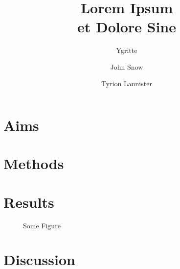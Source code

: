 \documentclass[a4paper]{p-oldpaper}
\title{Lorem Ipsum\\ et Dolore Sine}
\author[1]{Ygritte}
\author[1]{John Snow}
\author[2]{Tyrion Lannister}
\affil[1]{House Stark}
\affil[2]{House Lannister}
\begin{document}
\begin{multicols}{3}

	\section{Aims}
	\blindtext

	\section{Methods}
	\blindtext
	
	\section{Results}
	\blindtext
	
	\begin{figure}[H]
		\begin{center}
		\begin{pgfpicture}
		\end{pgfpicture}
		\end{center}
		\caption{Some Figure}
	\end{figure}
	
	\blindtext
	
	\blindtext
	
	\section{Discussion}
	\blindtext
	
	\blindtext
	
\end{multicols}
\end{document}
